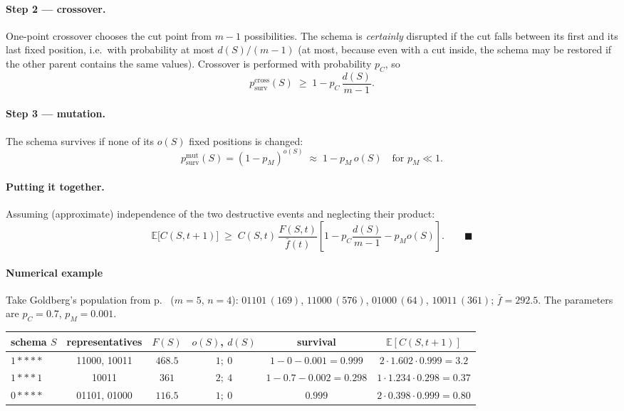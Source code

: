 \documentclass[11pt,a4paper]{article}
\theoremstyle{definition}
\begin{document}
\paragraph{Step 2 --- crossover.} One-point crossover chooses the cut point from
$m-1$ possibilities. The schema is \emph{certainly} disrupted if the cut falls
between its first and its last fixed position, i.e.\ with probability at most
$d(S)/(m-1)$ (at most, because even with a cut inside, the schema may be
restored if the other parent contains the same values). Crossover is performed
with probability $p_C$, so
\[
p_{\mathrm{surv}}^{\mathrm{cross}}(S) \;\ge\; 1 - p_C\,\frac{d(S)}{m-1}.
\]

\paragraph{Step 3 --- mutation.} The schema survives if none of its $o(S)$ fixed
positions is changed:
\[
p_{\mathrm{surv}}^{\mathrm{mut}}(S) = (1-p_M)^{o(S)} \;\approx\; 1 - p_M\,o(S)
\quad \text{for } p_M \ll 1 .
\]

\paragraph{Putting it together.} Assuming (approximate) independence of the two
destructive events and neglecting their product:
\[
\mathbb{E}\big[C(S,t+1)\big] \;\ge\; C(S,t)\,\frac{F(S,t)}{\bar f(t)}
\left[1 - p_C \frac{d(S)}{m-1} - p_M o(S)\right]. \qquad\blacksquare
\]

\paragraph{Numerical example}

Take Goldberg's population from p.~\pageref{ex:goldberg} ($m=5$, $n=4$):
$01101\,(169)$, $11000\,(576)$, $01000\,(64)$, $10011\,(361)$;
$\bar f = 292.5$. The parameters are $p_C = 0.7$, $p_M = 0.001$.

\begin{center}
\begin{tabular}{@{}lccccc@{}}
\toprule
schema $S$ & representatives & $F(S)$ & $o(S)$, $d(S)$ & survival & $\mathbb{E}[C(S,t{+}1)]$ \\
\midrule
$1{*}{*}{*}{*}$ & 11000, 10011 & $468.5$ & $1;\ 0$ &
  $1 - 0 - 0.001 = 0.999$ &
  $2 \cdot 1.602 \cdot 0.999 = 3.2$ \\
$1{*}{*}{*}1$ & 10011 & $361$ & $2;\ 4$ &
  $1 - 0.7 - 0.002 = 0.298$ &
  $1 \cdot 1.234 \cdot 0.298 = 0.37$ \\
$0{*}{*}{*}{*}$ & 01101, 01000 & $116.5$ & $1;\ 0$ &
  $0.999$ &
  $2 \cdot 0.398 \cdot 0.999 = 0.80$ \\
\bottomrule
\end{tabular}
\end{center}
\end{document}

